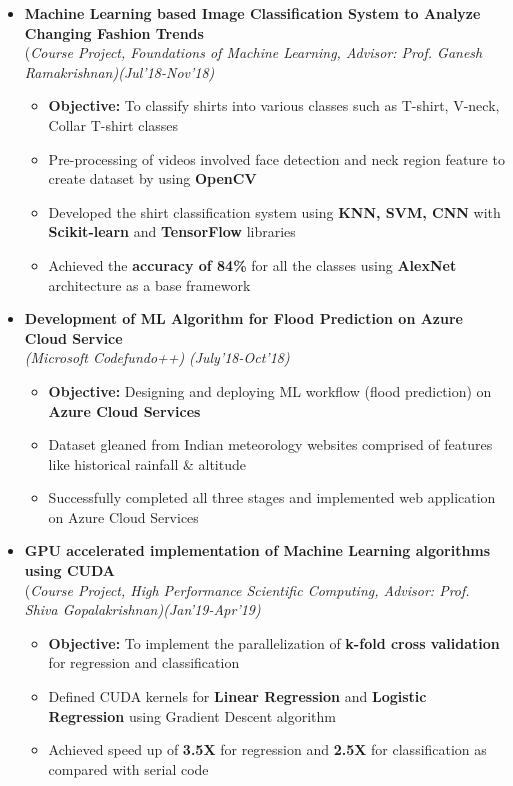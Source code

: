 \documentclass[a4paper,10pt]{article}
\newcommand{\isep}{-2 pt}
\begin{document}
\begin{itemize}

\item \textbf{Machine Learning based Image Classification System to Analyze Changing Fashion Trends} \\(\emph{Course Project, Foundations of Machine Learning, Advisor: Prof. Ganesh Ramakrishnan)\hfill (Jul'18-Nov'18)}
    \\ [-0.6cm]
    \begin{itemize}\itemsep \isep
    \item \textbf{Objective:} To classify shirts into various classes such as T-shirt, V-neck, Collar T-shirt classes
    \item Pre-processing of videos involved face detection and neck region feature to create dataset by using \textbf{OpenCV}
    \item Developed the shirt classification system using \textbf{KNN, SVM, CNN} with \textbf{Scikit-learn} and \textbf{TensorFlow} libraries
    \item Achieved the \textbf{accuracy of 84\%} for all the classes using \textbf{AlexNet} architecture as a base framework
    \end{itemize}

\item \textbf{Development of ML Algorithm for Flood Prediction on Azure Cloud Service} \\
\emph{(Microsoft Codefundo++)} \hfill \emph{(July'18-Oct'18)}
    \\ [-0.6cm]
    \begin{itemize}\itemsep \isep
  \item \textbf{Objective:} Designing and deploying ML workflow (flood prediction) on \textbf{Azure Cloud Services}
    \item Dataset gleaned from Indian meteorology websites comprised of features like historical rainfall \& altitude
     \item Successfully completed all three stages and implemented web application on Azure Cloud Services
    \end{itemize}

\item \textbf{GPU accelerated implementation of Machine Learning algorithms using CUDA} \\
(\emph{Course Project, High Performance Scientific Computing, Advisor: Prof. Shiva Gopalakrishnan)\hfill (Jan'19-Apr'19)}
    \\ [-0.6cm]
    \begin{itemize}\itemsep \isep
    \item \textbf{Objective:} To implement the parallelization of \textbf{k-fold cross validation} for regression and classification
    \item Defined CUDA kernels for \textbf{Linear Regression} and \textbf{Logistic Regression} using Gradient Descent algorithm
    \item Achieved speed up of  \textbf{3.5X} for regression and \textbf{2.5X} for classification as compared with serial code
    \end{itemize}


\end{itemize}
\end{document}
